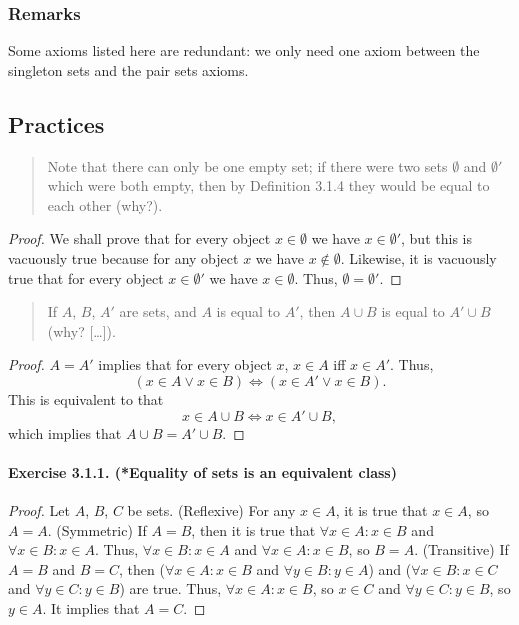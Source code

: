 \subsubsection{Remarks}
Some axioms listed here are redundant: we only need one axiom between the singleton sets and the pair sets axioms.

\subsection{Practices}
\begin{quote}
    Note that there can only be one empty set; if there were two sets $\emptyset$ and $\emptyset'$ which were both empty, then by Definition 3.1.4 they would be equal to each other (why?).
\end{quote}
\begin{proof}
    We shall prove that for every object $x \in \emptyset$ we have $x \in \emptyset'$, but this is vacuously true because for any object $x$ we have $x \notin \emptyset$. Likewise, it is vacuously true that for every object $x \in \emptyset'$ we have $x \in \emptyset$. Thus, $\emptyset = \emptyset'$.
\end{proof}

\begin{quote}
    If $A$, $B$, $A'$ are sets, and $A$ is equal to $A'$, then $A \cup B$ is equal to $A' \cup B$ (why? [\ldots]).
\end{quote}
\begin{proof}
    $A=A'$ implies that for every object $x$, $x\in A$ iff $x\in A'$. Thus, \[(x\in A \lor x\in B) \iff (x\in A' \lor x\in B).\] This is equivalent to that \[x\in A\cup B \iff x\in A'\cup B,\] which implies that $A\cup B = A'\cup B$.
\end{proof}

\paragraph{Exercise 3.1.1. (*Equality of sets is an equivalent class)}
\begin{proof}
    Let $A$, $B$, $C$ be sets.
    (Reflexive) For any $x \in A$, it is true that $x \in A$, so $A=A$.
    (Symmetric) If $A=B$, then it is true that $\forall x \in A : x \in B$ and $\forall x \in B : x \in A$. Thus, $\forall x \in B : x \in A$ and $\forall x \in A : x \in B$, so $B=A$.
    (Transitive) If $A=B$ and $B=C$, then ($\forall x \in A : x \in B$ and $\forall y \in B : y \in A$) and ($\forall x \in B : x \in C$ and $\forall y \in C : y \in B$) are true. Thus, $\forall x \in A : x \in B$, so $x\in C$ and $\forall y \in C : y \in B$, so $y \in A$. It implies that $A=C$.
\end{proof}

